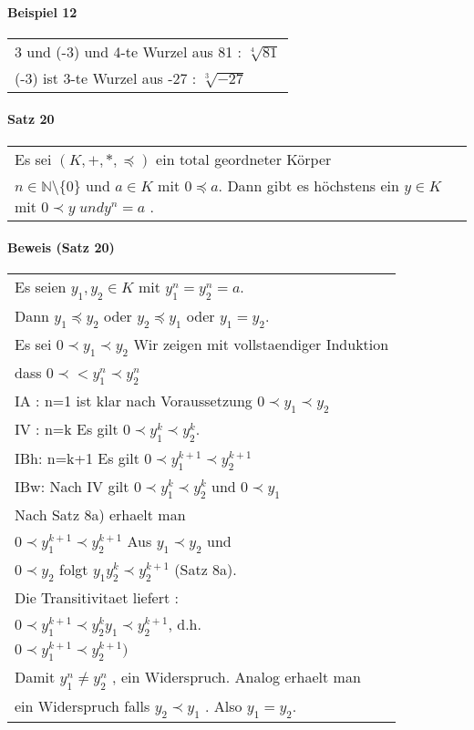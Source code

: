 \documentclass[a4paper]{scrartcl}
\begin{document}
\paragraph{Beispiel 12}
\begin{tabbing}
\begin{tabular}{l}
3 und (-3) und 4-te Wurzel aus 81 : $\sqrt[4]{81}$\\
(-3) ist 3-te Wurzel aus -27 : $\sqrt[3]{-27}$
\end{tabular}
\end{tabbing}

\paragraph{Satz 20}
\begin{tabbing}
\begin{tabular}{l}
Es sei $(K,+,*,\preceq)$ ein total geordneter Körper \\
$ n\in \mathbb{N} \setminus \{ 0\} $ und $a\in K$ mit $ 0 \preceq a$.
Dann gibt es höchstens ein $y\in K$ mit $0 \prec y \; und y^n = a$ .\\
\end{tabular}
\end{tabbing}

\paragraph{Beweis (Satz 20)}
\begin{tabbing}
\begin{tabular}{l}
Es seien $y_1,y_2 \in K$ mit $y^n_1 = y^n_2 = a$.\\
Dann $y_1 \preceq y_2$ oder $y_2 \preceq y_1$ oder $ y_1 = y_2$.\\
Es sei $0\prec y_1 \prec y_2$ Wir zeigen mit vollstaendiger Induktion\\
dass $0 \prec <y^n_1 \prec y^n_2$\\
IA : n=1 ist klar nach Voraussetzung $ 0 \prec y_1 \prec y_2 $\\
IV : n=k Es gilt $ 0 \prec y^k_1 \prec y^k_2$.\\
IBh: n=k+1 Es gilt $0 \prec y^{k+1}_1 \prec y^{k+1}_2$\\
IBw: Nach IV gilt $0 \prec y^k_1 \prec y^k_2$ und $0\prec y_1$ \\
Nach Satz 8a) erhaelt man\\
$0 \prec y^{k+1}_1 \prec y^{k+1}_2$ Aus $y_1 \prec y_2$ und\\
$0 \prec y_2$ folgt $ y_1y_2^k \prec y_2^{k+1} $ (Satz 8a). \\
Die Transitivitaet liefert :\\
$0 \prec y_1^{k+1} \prec y_2^ky_1\prec y_2^{k+1}$, d.h.\\
$0\prec y_1^{k+1} \prec y_2^{k+1})$\\
Damit $y_1^n \neq y_2^n$ , ein Widerspruch. Analog erhaelt man\\
ein Widerspruch falls $y_2 \prec y_1$ . Also $y_1 = y_2$.
\end{tabular}
\end{tabbing}
\end{document}

